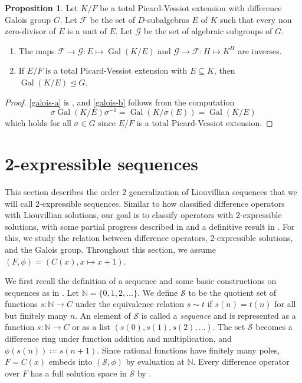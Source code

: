 \documentclass[11pt,reqno]{amsart}
\theoremstyle{definition}
\newtheorem{proposition}[theorem]{Proposition}
\DeclareMathOperator{\Gal}{Gal}
\begin{document}
\begin{proposition}
\label{prop:galois-correspondence}
Let $K/F$ be a total Picard-Vessiot extension with difference Galois group $G$. Let $\mathcal{F}$ be the set of $D$-subalgebras $E$ of $K$ such that every non zero-divisor of $E$ is a unit of $E$. Let $\mathcal{G}$ be the set of algebraic subgroups of $G$. 
    \begin{enumerate}[label=(\alph*)]
        \item\label{galois-a} The maps $\mathcal{F}\to \mathcal{G}\colon E\mapsto \Gal (K/E)$ and $\mathcal{G}\to \mathcal{F}\colon H\mapsto K^{H}$ are inverses. 
        \item\label{galois-b}\sloppy If $E/F$ is a total Picard-Vessiot extension with $E \subseteq K$, then $\Gal(K/E)\trianglelefteq G$.
    \end{enumerate}
\end{proposition}
\begin{proof}
    \ref{galois-a} is \cite[Theorem 1.29]{put2006galois}, and 
    \ref{galois-b} follows from the computation 
    \[
        \sigma \Gal (K/E)\sigma^{-1} = \Gal (K/\sigma (E)) = \Gal (K/E)
    \]
    which holds for all $\sigma\in G$ since $E/F$ is a total Picard-Vessiot extension.
\end{proof}


\section{2-expressible sequences}
\label{section:eulerian}

This section describes the order $2$ generalization of Liouvillian sequences that we will call $2$-expressible sequences. 
Similar to how \cite{hendricks1999solving} classified difference operators with Liouvillian solutions, our goal is to classify operators with 2-expressible solutions, with some partial progress described in  and a definitive result in .
For this, we study the relation between difference operators, $2$-expressible solutions, and the Galois group.
Throughout this section, we assume $(F,\phi)=(C(x),x\mapsto x+1)$.

We first recall the definition of a sequence and some basic constructions on sequences as in \cite[Section 3]{hendricks1999solving}. 
Let $\mathbb{N}=\lbrace 0,1,2,\dots\rbrace$.
We define $\mathcal{S}$ to be the quotient set of functions $s\colon\mathbb{N}\to C$ under the equivalence relation $s\sim t$ if $s(n) = t(n)$ for all but finitely many $n$. 
An element of $\mathcal{S}$ is called a \emph{sequence} and is represented as a function $s\colon\mathbb{N}\to C$ or as a list $(s(0),s(1),s(2),\dots)$. 
The set $\mathcal{S}$ becomes a difference ring under function addition and multiplication, and $\phi (s(n))\coloneqq s(n+1)$.
Since rational functions have finitely many poles, $F=C(x)$ embeds into $(\mathcal{S},\phi)$ by evaluation at $\mathbb{N}$.
Every difference operator over $F$ has a full solution space in $\mathcal{S}$ by \cite[Theorem 8.2.1]{petkovvsek1997wilf}.
\end{document}
